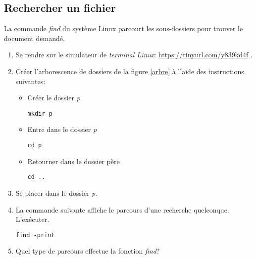 \documentclass[a4paper,11pt]{article}
\begin{document}
\begin{Form}
\section{Rechercher un fichier}
La commande \emph{find} du système Linux parcourt les sous-dossiers pour trouver le document demandé.
\\
\begin{activite}
\begin{enumerate}
\item Se rendre sur le simulateur de \emph{terminal Linux}: \url{https://tinyurl.com/y839kd4f} .
\item Créer l'arborescence de dossiers de la figure \ref{arbre} à l'aide des instructions suivantes:
\begin{itemize}
\item Créer le dossier \emph{p}
\begin{lstlisting}
mkdir p
\end{lstlisting}
\item Entre dans le dossier \emph{p}
\begin{lstlisting}
cd p
\end{lstlisting}
\item Retourner dans le dossier père
\begin{lstlisting}
cd ..
\end{lstlisting}
\end{itemize}
\item Se placer dans le dossier \emph{p}.
\item La commande suivante affiche le parcours d'une recherche quelconque. L'exécuter.
\begin{lstlisting}
find -print
\end{lstlisting}
\item Quel type de parcours effectue la fonction \emph{find}?
\end{enumerate}
\end{activite}
\end{Form}
\end{document}
